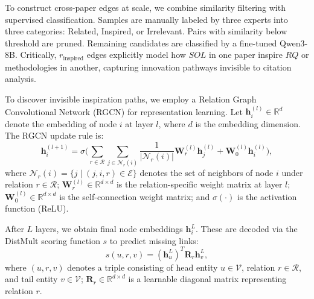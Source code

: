 \documentclass[runningheads]{llncs}
\begin{document}
To construct cross-paper edges at scale, we combine similarity filtering with supervised classification. Samples are manually labeled by three experts into three categories: Related, Inspired, or Irrelevant. Pairs with similarity below threshold are pruned. Remaining candidates are classified by a fine-tuned Qwen3-8B. Critically, $r_{\text{inspired}}$ edges explicitly model how $SOL$ in one paper inspire $RQ$ or methodologies in another, capturing innovation pathways invisible to citation analysis.

To discover invisible inspiration paths, we employ a Relation Graph Convolutional Network (RGCN) for representation learning. Let $\mathbf{h}_i^{(l)} \in \mathbb{R}^d$ denote the embedding of node $i$ at layer $l$, where $d$ is the embedding dimension. The RGCN update rule is:
\begin{equation}
    \mathbf{h}_i^{(l+1)} = \sigma \Bigg( \sum_{r \in \mathcal{R}} \sum_{j \in \mathcal{N}_r(i)} \frac{1}{|\mathcal{N}_r(i)|} \mathbf{W}_r^{(l)} \mathbf{h}_j^{(l)} + \mathbf{W}_0^{(l)} \mathbf{h}_i^{(l)} \Bigg),
\end{equation}
where $\mathcal{N}_r(i) = \{j \mid (j, i, r) \in \mathcal{E}\}$ denotes the set of neighbors of node $i$ under relation $r \in \mathcal{R}$; $\mathbf{W}_r^{(l)} \in \mathbb{R}^{d \times d}$ is the relation-specific weight matrix at layer $l$; $\mathbf{W}_0^{(l)} \in \mathbb{R}^{d \times d}$ is the self-connection weight matrix; and $\sigma(\cdot)$ is the activation function (ReLU).

After $L$ layers, we obtain final node embeddings $\mathbf{h}_i^L$. These are decoded via the DistMult scoring function $s$ to predict missing links:
\begin{equation}
    s(u, r, v) = (\mathbf{h}_u^L)^T \mathbf{R}_r \mathbf{h}_v^L,
\end{equation}
where $(u, r, v)$ denotes a triple consisting of head entity $u \in \mathcal{V}$, relation $r \in \mathcal{R}$, and tail entity $v \in \mathcal{V}$; $\mathbf{R}_r \in \mathbb{R}^{d \times d}$ is a learnable diagonal matrix representing relation $r$.


\end{document}
